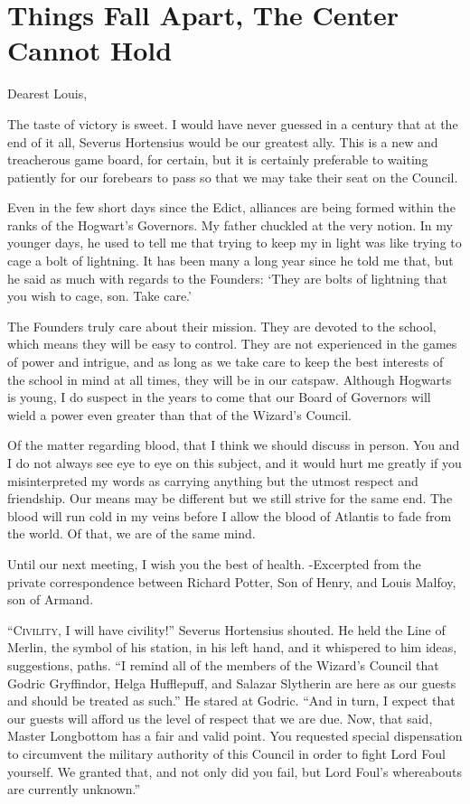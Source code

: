 \chapter{Things Fall Apart, The Center Cannot Hold}

Dearest Louis,

The taste of victory is sweet. I would have never guessed in a century that at the end of it all, Severus Hortensius would be our greatest ally. This is a new and treacherous game board, for certain, but it is certainly preferable to waiting patiently for our forebears to pass so that we may take their seat on the Council.

Even in the few short days since the Edict, alliances are being formed within the ranks of the Hogwart’s Governors. My father chuckled at the very notion. In my younger days, he used to tell me that trying to keep my in light was like trying to cage a bolt of lightning. It has been many a long year since he told me that, but he said as much with regards to the Founders: ‘They are bolts of lightning that you wish to cage, son. Take care.’

The Founders truly care about their mission. They are devoted to the school, which means they will be easy to control. They are not experienced in the games of power and intrigue, and as long as we take care to keep the best interests of the school in mind at all times, they will be in our catspaw. Although Hogwarts is young, I do suspect in the years to come that our Board of Governors will wield a power even greater than that of the Wizard’s Council.

Of the matter regarding blood, that I think we should discuss in person. You and I do not always see eye to eye on this subject, and it would hurt me greatly if you misinterpreted my words as carrying anything but the utmost respect and friendship. Our means may be different but we still strive for the same end. The blood will run cold in my veins before I allow the blood of Atlantis to fade from the world. Of that, we are of the same mind.

Until our next meeting, I wish you the best of health.
-Excerpted from the private correspondence between Richard Potter, Son of Henry, and Louis Malfoy, son of Armand.

\simpleline


\lettrine{“C}{ivility}, I will have civility!” Severus Hortensius shouted. He held the Line of Merlin, the symbol of his station, in his left hand, and it whispered to him ideas, suggestions, paths. “I remind all of the members of the Wizard’s Council that Godric Gryffindor, Helga Hufflepuff, and Salazar Slytherin are here as our guests and should be treated as such.” He stared at Godric. “And in turn, I expect that our guests will afford us the level of respect that we are due. Now, that said, Master Longbottom has a fair and valid point. You requested special dispensation to circumvent the military authority of this Council in order to fight Lord Foul yourself. We granted that, and not only did you fail, but Lord Foul’s whereabouts are currently unknown.”

